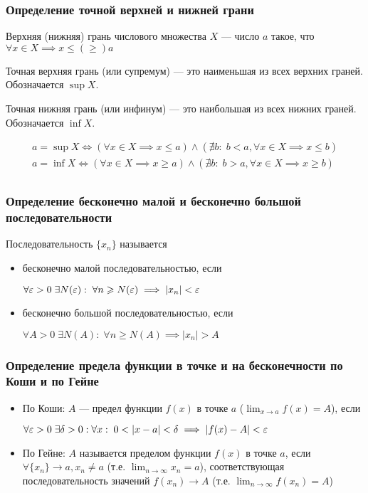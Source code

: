 \documentclass[12pt, a4paper]{article}
\begin{document}
	\subsubsection{Определение точной верхней и нижней грани}
	Верхняя (нижняя) грань числового множества $X$ --- число $a$ такое, что $\forall x \in X \implies x \leq (\geq) a$

	Точная верхняя грань (или супремум) ---	это наименьшая из всех верхних граней. Обозначается $\sup X$.

	Точная нижняя грань (или инфинум) --- это наибольшая из всех нижних граней. Обозначается $\inf X$.

	\[\begin{gathered}
		a = \sup X \iff (\forall x \in X \implies x \leq a) \land (\nexists b: \;b < a, \forall x \in X \implies x \leq b) \\
		a = \inf X \iff (\forall x \in X \implies x \geq a) \land (\nexists b: \;b > a, \forall x \in X \implies x \geq b) \\
	\end{gathered}\]

	\subsubsection{Определение бесконечно малой и бесконечно большой последовательности}
	Последовательность $\{x_n\}$ называется 
	\begin{itemize}
		\item
		бесконечно малой последовательностью, если 

		$\forall \varepsilon > 0 \; \exists N(\varepsilon): \; \forall n \geqslant N(\varepsilon) \implies |x_n| < \varepsilon$

		\item
		бесконечно большой последовательностью, если 

		$\forall A > 0 \; \exists N(A): \; \forall n \geq N(A) \implies |x_n| > A$
	\end{itemize}

	\subsubsection{Определение предела функции в точке и на бесконечности по Коши и по Гейне}
	\begin{itemize}
		\item
		По Коши: $A$ --- предел функции $f(x)$ в точке $a$ ($\lim_{x \to a} f(x) = A$), если 

		$\forall \varepsilon > 0 \; \exists \delta > 0: \forall x: \; 0 < |x - a| < \delta \implies |f(x) - A| < \varepsilon$

		\item
		По Гейне: $A$ называется пределом функции $f(x)$ в точке $a$, если $\forall \{x_n\} \to a, x_n \neq a$ (т.е. $\lim_{n \to \infty} x_n = a$), соответствующая последовательность значений $f(x_n) \to A$ (т.е. $\lim_{n \to \infty} f(x_n) = A$)
	\end{itemize}
\end{document}
